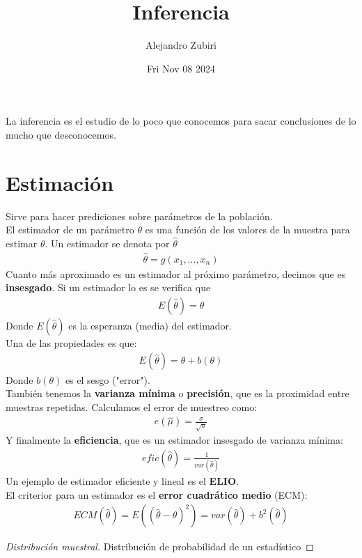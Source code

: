 \documentclass{article}
\author{Alejandro Zubiri}
\date{Fri Nov 08 2024}
\title{Inferencia}
\begin{document}
\maketitle
\tableofcontents
\pagebreak
La inferencia es el estudio de lo poco que conocemos para sacar conclusiones de lo mucho que desconocemos.
\section{Estimación}
Sirve para hacer prediciones sobre parámetros de la población.\\
El estimador de un parámetro $\theta $ es una función de los valores de la muestra para estimar $\theta $. Un estimador
se denota por $\hat{\theta }$
\begin{equation}
    \begin{split}
        \hat{\theta }=g(x_{1},\dots,x_{n})
    \end{split}
\end{equation}
Cuanto más aproximado es un estimador al próximo parámetro, decimos que es \textbf{insesgado}. Si un estimador lo es
se verifica que
\begin{equation}
    \begin{split}
        E(\hat{\theta })=\theta 
    \end{split}
\end{equation}
Donde $E(\hat{\theta })$ es la esperanza (media) del estimador.\\
Una de las propiedades es que:
\begin{equation}
    \begin{split}
        E(\hat{\theta })= \theta +b(\theta )
    \end{split}
\end{equation}
Donde $b(\theta )$ es el sesgo ("error").\\
También tenemos la \textbf{varianza mínima} o \textbf{precisión}, que es la proximidad entre muestras repetidas.
Calculamos el error de muestreo como:
\begin{equation}
    \begin{split}
        e(\hat{\mu })= \frac{\sigma }{\sqrt{n}}
    \end{split}
\end{equation}
Y finalmente la \textbf{eficiencia}, que es un estimador insesgado de varianza mínima:
\begin{equation}
    \begin{split}
        efic(\hat{\theta })= \frac{1}{var(\hat{\theta })}
    \end{split}
\end{equation}
Un ejemplo de estimador eficiente y lineal es el \textbf{ELIO}.\\
El criterior para un estimador es el \textbf{error cuadrático medio} (ECM):
\begin{equation}
    \begin{split}
        ECM(\hat{\theta })= E((\hat{\theta }-\theta )^{2})= var(\hat{\theta })+ b^{2}(\hat{\theta })
    \end{split}
\end{equation}
\begin{proof}[Distribución muestral]
    Distribución de probabilidad de un estadístico
\end{proof}
\end{document}

